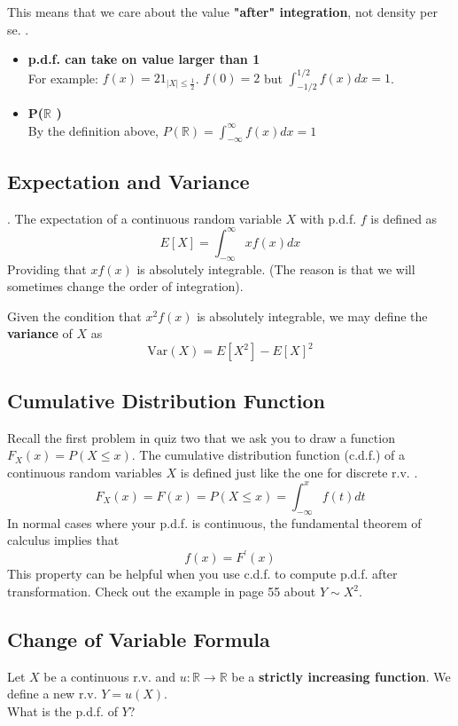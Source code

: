 This means that we care about the value \textbf{"after" integration}, not density per se. .
\begin{itemize}
    \item \textbf{p.d.f. can take on value larger than 1} \\ 
            For example: \(f(x) = 2 1_{|X| \leq  \frac{1}{2}} \). \(f(0) = 2\) but \(\int_{-1 /2 }^{1 /2} f(x)dx  = 1\).   
    \item \textbf{P(\(\mathbb{R} \) )}\\ 
            By the definition above, \(P(\mathbb{R} ) = \int_{-\infty }^{\infty} f(x)dx = 1 \)   
\end{itemize}

\subsection{Expectation and Variance}. 
The expectation of a continuous random variable \(X\) with p.d.f. \(f\) is defined as 
\[
    E[X] = \int_{-\infty }^{\infty } x f(x)dx
\] 
Providing that \(xf(x)\) is absolutely integrable. (The reason is that we will sometimes change the order of integration). 

Given the condition that  \(x^2 f(x)\) is absolutely integrable, we may define the \textbf{variance} of \(X\) as 
\[
    \text{Var}(X) = E[X^{2} ] - E[X]^2 
\]

\subsection{Cumulative Distribution Function}
Recall the first problem in quiz two that we ask you to draw a function \(F_X(x) = P(X \leq x)\). The cumulative distribution function (c.d.f.) of a continuous random variables \(X\) is defined just like the one for discrete r.v. . 
\[
    F_X(x) =F(x) =  P(X \leq  x) = \int_{-\infty }^x f(t)dt
\] 
In normal cases where your p.d.f. is continuous, the fundamental theorem of calculus implies that 
\[
    f(x) = F^\prime (x)
\]
This property can be helpful when you use c.d.f. to compute p.d.f. after transformation. Check out the example in \cite{Und_Chatterjee} page 55 about \(Y \sim X^2\).  

\subsection{Change of Variable Formula}
Let \(X\) be a continuous r.v. and \(u:\mathbb{R}\to \mathbb{R}\) be a \textbf{strictly increasing function}. We define a new r.v. \(Y = u(X)\). 
\\What is the p.d.f. of \(Y\)?  

